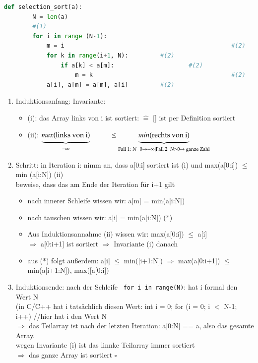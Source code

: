 \documentclass[11pt, fleqn]{scrreprt}
\begin{document}
\begin{itemize}
		\begin{lstlisting}[language=Python]
		def selection_sort(a):
		N = len(a)
		#(1)
		for i in range (N-1):					
			m = i												#(2)
			for k in range(i+1, N):			#(2)
				if a[k] < a[m]:						#(2)
					m = k										#(2)
			a[i], a[m] = a[m], a[i]			#(2)
		\end{lstlisting}
		\begin{enumerate}
		\item Induktionsanfang: Invariante:
		\begin{itemize}[label={}]
		\item (i): das Array links von i ist sortiert: $\widehat{=}$ [] ist per Definition sortiert 
		\item (ii): $\underbrace{max(\text{links von i})}_{- \infty}\hspace*{1cm} \leq \underbrace{min(\text{rechts von i})}_{\text{Fall 1: } N = 0 \rightarrow - \infty | 
			\text{Fall 2: } N > 0 \rightarrow \text{ ganze Zahl}}$
		\end{itemize}
		\item Schritt: in Iteration i: nimm an, dass a[0:i] sortiert ist (i) und max(a[0:i]) $\leq$ min (a[i:N]) (ii)\\
		beweise, dass das am Ende der Iteration für i+1 gilt 
		\begin{itemize}
		\item nach innerer Schleife wissen wir: a[m] = min(a[i:N])
		\item nach tauschen wissen wir: a[i] = min(a[i:N]) (*)
		\item Aus Induktionsannahme (ii) wissen wir: max(a[0:i]) $\leq$ a[i] \\
		$\Rightarrow$ a[0:i+1] ist sortiert $\Rightarrow$ Invariante (i) danach
		\item aus (*) folgt außerdem: a[i] $\leq$ min([i+1:N]) $\Rightarrow$ max(a[0:i+1]) $\leq$ min(a[i+1:N]), max([a[0:i])
		\end{itemize}
		\item Induktionsende: nach der Schleife \verb| for i in range(N)|: hat i formal den Wert N\\
		(in C/C++ hat i tatsächlich diesen Wert: int i = 0; for (i = 0; i $<$ N-1; i++) {} //hier hat i den Wert N \\
		$\Rightarrow$ das Teilarray ist nach der letzten Iteration: a[0:N] == a, also das gesamte Array.\\
		wegen Invariante (i) ist das linnke Teilarray immer sortiert \\
		$\Rightarrow$ das ganze Array ist sortiert \hspace*{9cm} $\square$
		\end{enumerate}
	\end{itemize}
		
\end{document}
